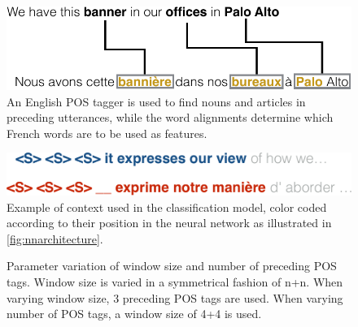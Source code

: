\documentclass[11pt]{article}
\begin{document}
\begin{figure}[tbp]
    \centering
    \includegraphics[width=\columnwidth]{figures/posexample.pdf}
    \caption{An English POS tagger is used to find nouns and articles in preceding utterances, while the word alignments determine which French words are to be used as features.}
    \label{fig:posexample}
\end{figure}

\begin{figure}[tbp]
    \centering
    \includegraphics[width=\columnwidth]{figures/contextexample.pdf}
    \caption{Example of context used in the classification model, color coded according to their position in the neural network as illustrated in \cref{fig:nnarchitecture}.}
    \label{fig:contextexample}
\end{figure}

\begin{figure}[t]
\caption{Parameter variation of window size and number of preceding POS tags. Window size is varied in a symmetrical fashion of n+n. When varying window size, 3 preceding POS tags are used. When varying number of POS tags, a window size of 4+4 is used.}
\label{figure:parametervary}
\end{figure}
\end{document}
